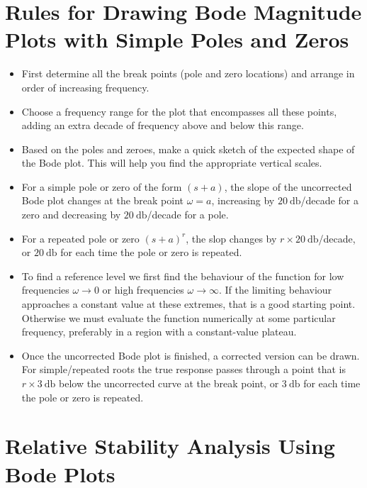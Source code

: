 \documentclass[
  14pt,
  a4paper,
  oneside,
  open=any,
  a4paper,
  14pt]{report}
\providecommand{\tightlist}{%
  \setlength{\itemsep}{0pt}\setlength{\parskip}{0pt}}\usepackage{longtable,booktabs,array}
\begin{document}
\section{Rules for Drawing Bode Magnitude Plots with Simple Poles and
Zeros}\label{rules-for-drawing-bode-magnitude-plots-with-simple-poles-and-zeros}

\begin{itemize}
\tightlist
\item
  First determine all the break points (pole and zero locations) and
  arrange in order of increasing frequency.
\item
  Choose a frequency range for the plot that encompasses all these
  points, adding an extra decade of frequency above and below this
  range.
\item
  Based on the poles and zeroes, make a quick sketch of the expected
  shape of the Bode plot. This will help you find the appropriate
  vertical scales.
\item
  For a simple pole or zero of the form \((s+a)\), the slope of the
  uncorrected Bode plot changes at the break point \(\omega = a\),
  increasing by \(\SI{20}{\decibel}\)/decade for a zero and decreasing
  by \(\SI{20}{\decibel}\)/decade for a pole.
\item
  For a repeated pole or zero \((s+a)^r\), the slop changes by
  \(r\times\SI{20}{\decibel}\)/decade, or \(\SI{20}{\decibel}\) for each
  time the pole or zero is repeated.
\item
  To find a reference level we first find the behaviour of the function
  for low frequencies \(\omega \to 0\) or high frequencies
  \(\omega \to \infty\). If the limiting behaviour approaches a constant
  value at these extremes, that is a good starting point. Otherwise we
  must evaluate the function numerically at some particular frequency,
  preferably in a region with a constant-value plateau.
\item
  Once the uncorrected Bode plot is finished, a corrected version can be
  drawn. For simple/repeated roots the true response passes through a
  point that is \(r\times\SI{3}{\decibel}\) below the uncorrected curve
  at the break point, or \(\SI{3}{\decibel}\) for each time the pole or
  zero is repeated.
\end{itemize}

\section{Relative Stability Analysis Using Bode
Plots}\label{relative-stability-analysis-using-bode-plots}
\end{document}
